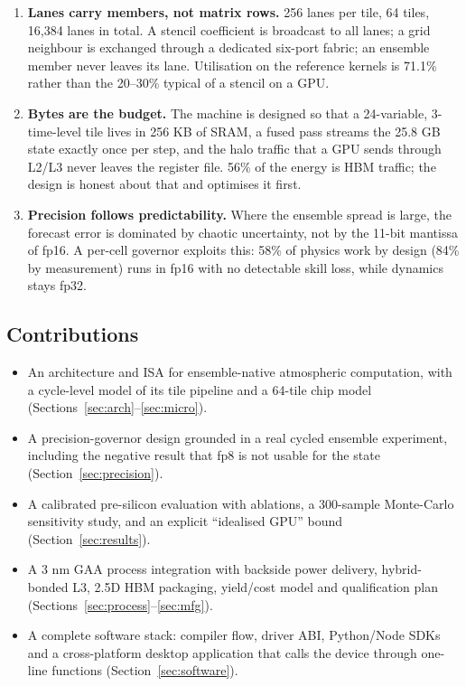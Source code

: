 \begin{enumerate}[leftmargin=1.4em,itemsep=1pt]
\item \textbf{Lanes carry members, not matrix rows.} 256 lanes per tile, 64 tiles, 16,384 lanes in
      total. A stencil coefficient is broadcast to all lanes; a grid neighbour is exchanged through
      a dedicated six-port fabric; an ensemble member never leaves its lane. Utilisation on the
      reference kernels is 71.1\% rather than the 20--30\% typical of a stencil on a GPU.
\item \textbf{Bytes are the budget.} The machine is designed so that a 24-variable, 3-time-level
      tile lives in 256 KB of SRAM, a fused pass streams the 25.8 GB state exactly once per step,
      and the halo traffic that a GPU sends through L2/L3 never leaves the register file. 56\% of
      the energy is HBM traffic; the design is honest about that and optimises it first.
\item \textbf{Precision follows predictability.} Where the ensemble spread is large, the forecast
      error is dominated by chaotic uncertainty, not by the 11-bit mantissa of fp16. A per-cell
      governor exploits this: 58\% of physics work by design (84\% by measurement) runs in fp16
      with no detectable skill loss, while dynamics stays fp32.
\end{enumerate}

\subsection{Contributions}
\begin{itemize}[leftmargin=1.4em,itemsep=1pt]
\item An architecture and ISA for ensemble-native atmospheric computation, with a cycle-level
      model of its tile pipeline and a 64-tile chip model (Sections~\ref{sec:arch}--\ref{sec:micro}).
\item A precision-governor design grounded in a real cycled ensemble experiment, including the
      negative result that fp8 is not usable for the state (Section~\ref{sec:precision}).
\item A calibrated pre-silicon evaluation with ablations, a 300-sample Monte-Carlo sensitivity
      study, and an explicit ``idealised GPU'' bound (Section~\ref{sec:results}).
\item A 3 nm GAA process integration with backside power delivery, hybrid-bonded L3, 2.5D HBM
      packaging, yield/cost model and qualification plan (Sections~\ref{sec:process}--\ref{sec:mfg}).
\item A complete software stack: compiler flow, driver ABI, Python/Node SDKs and a cross-platform
      desktop application that calls the device through one-line functions (Section~\ref{sec:software}).
\end{itemize}

